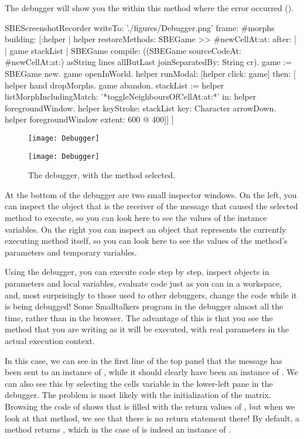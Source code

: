 \documentclass[a4paper,10pt,twoside]{book}
\begin{document}
The debugger will show you the  within this method where the error occurred ().

\begin{ExecuteSmalltalkScript}
SBEScreenshotRecorder writeTo: './figures/Debugger.png' frame: #morphs building: [:helper |
	helper restoreMethods: {SBEGame >> #newCellAt:at:} after: [
		| game stackList |
		SBEGame compile: ((SBEGame sourceCodeAt: #newCellAt:at:) asString
			lines allButLast joinSeparatedBy: String cr).
		game := SBEGame new.
		game openInWorld.
		helper
			runModal: [helper click: game]
			then: [
				helper hand dropMorphs.
				game abandon.
				stackList := helper listMorphIncludingMatch: '*toggleNeighboursOfCellAt:at:*' in: helper foregroundWindow.
				helper keyStroke: stackList key: Character arrowDown.
				helper foregroundWindow extent: 600 @ 400]]
]
\end{ExecuteSmalltalkScript}
\begin{figure}[ht]
\ifluluelse
	{\centerline {\texttt{[image: Debugger]}}}
	{\centerline {\texttt{[image: Debugger]}}}
\caption{The debugger, with the method   selected.
\label{fig:debugToggle}}
\end{figure}

At the bottom of the debugger are two small inspector windows.
On the left, you can inspect the object that is the receiver of the message that caused the selected method to execute, so you can look here to see the values of the instance variables.
On the right you can inspect an object that represents the currently executing method itself, so you can look here to see the values of the method's parameters and temporary variables.

Using the debugger, you can execute code step by step, inspect objects in parameters and local variables, evaluate code just as you can in a workspace, and, most surprisingly to those used to other debuggers, change the code while it is being debugged!
Some Smalltalkers program in the debugger almost all the time, rather than in the browser.
The advantage of this is that you see the method that you are writing as it will be executed, with real parameters in the actual execution context.

In this case, we can see in the first line of the top panel that the  message has been sent to an instance of , while it should clearly have been an instance of .
We can also see this by selecting the cells variable in the lower-left pane in the debugger.
The problem is most likely with the initialization of the  matrix.
Browsing the code of  shows that  is filled with the return values of , but when we look at that method, we see that there is no return statement there!
By default, a method returns , which in the case of  is indeed an instance of .
\end{document}
